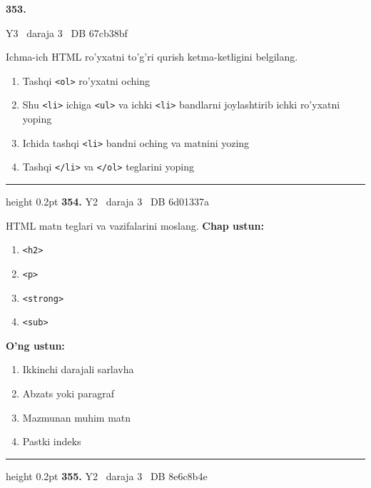 \documentclass[10pt,a4paper,oneside]{article}
\begin{document}
\hypertarget{q353}{\textbf{\color{ink}353.}}  {\color{muted}\scriptsize Y3 \textbullet\ daraja 3 \textbullet\ DB 67cb38bf}
\par
Ichma-ich HTML ro'yxatni to'g'ri qurish ketma-ketligini belgilang.
\begin{enumerate}[label=\Alph*),leftmargin=9mm]
\item Tashqi \texttt{\textless{}ol\textgreater{}} ro'yxatni oching
\item Shu \texttt{\textless{}li\textgreater{}} ichiga \texttt{\textless{}ul\textgreater{}} va ichki \texttt{\textless{}li\textgreater{}} bandlarni joylashtirib ichki ro'yxatni yoping
\item Ichida tashqi \texttt{\textless{}li\textgreater{}} bandni oching va matnini yozing
\item Tashqi \texttt{\textless{}/li\textgreater{}} va \texttt{\textless{}/ol\textgreater{}} teglarini yoping
\end{enumerate}
\vspace{2mm}\hrule height 0.2pt \vspace{4mm}
\hypertarget{q354}{\textbf{\color{ink}354.}}  {\color{muted}\scriptsize Y2 \textbullet\ daraja 3 \textbullet\ DB 6d01337a}
\par
HTML matn teglari va vazifalarini moslang.
\textbf{\footnotesize Chap ustun:}
\begin{enumerate}[label=\arabic*),leftmargin=9mm]
\item \texttt{\textless{}h2\textgreater{}}
\item \texttt{\textless{}p\textgreater{}}
\item \texttt{\textless{}strong\textgreater{}}
\item \texttt{\textless{}sub\textgreater{}}
\end{enumerate}
\textbf{\footnotesize O'ng ustun:}
\begin{enumerate}[label=\Alph*),leftmargin=9mm]
\item Ikkinchi darajali sarlavha
\item Abzats yoki paragraf
\item Mazmunan muhim matn
\item Pastki indeks
\end{enumerate}
\vspace{2mm}\hrule height 0.2pt \vspace{4mm}
\hypertarget{q355}{\textbf{\color{ink}355.}}  {\color{muted}\scriptsize Y2 \textbullet\ daraja 3 \textbullet\ DB 8e6c8b4e}
\end{document}
